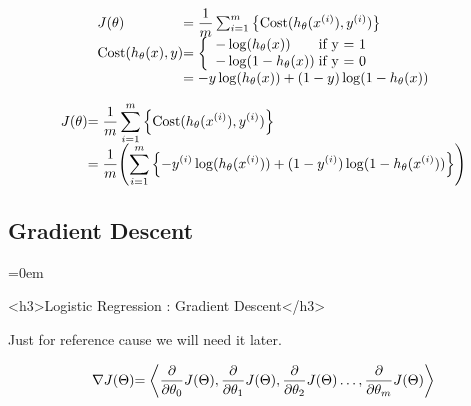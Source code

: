 	\[
	\begin{array}{ l@{} l@{} } 
	J(\theta)
	& =
	\dfrac{1}{m}
	\sum_{i=1}^m
	\left\{
		\mathrm{Cost}(h_\theta(x^{(i)}),y^{(i)})
	\right\} 
	\\ 
	\mathrm{Cost}(h_\theta(x),y)
	& =
	\left\{ 
		\begin{array}{ l@{} l@{} } 
			-\log(h_\theta(x))
			\;
			& \text{if y = 1} 
			\\ 
			-\log(1-h_\theta(x))
			\;
			& \text{if y = 0} 
		\end{array}
	\right.  
	\\ 
	& = 
	-y\log(h_\theta(x))
	+
	(1-y)\log(1-h_\theta(x)) 
	\end{array}
\]


\[
	\begin{array}{ l@{} l@{} } 
	J(\theta)
	& =
	{ \displaystyle 
		\dfrac{1}{m}
		\sum_{i=1}^m
		\left\{
			\mathrm{Cost}(h_\theta(x^{(i)}),y^{(i)})
		\right\}
	}
	\\ 
	& =
	\dfrac{1}{m} 
	{ \displaystyle 
		\left(
			\sum_{i=1}^m
			\left\{
				-y^{(i)}\log(h_\theta(x^{(i)}))
				+
				(1-y^{(i)})\log(1-h_\theta(x^{(i)}))
			\right\}
		\right)
	} 
	\end{array}
\]

\subsectionend
\subsection{Gradient Descent}
\label{ssec:gradient_descent}
\parindent=0em

	<h3>Logistic Regression : Gradient Descent</h3>

Just for reference cause we will need it later.

\[
	\begin{array}{ l@{} l@{} }
		\nabla J(\Theta)
		& =
		\left\langle
		  {\displaystyle \frac{\partial}{\partial \theta_0} J(\Theta)}
		, {\displaystyle \frac{\partial}{\partial \theta_1} J(\Theta)}
		, {\displaystyle \frac{\partial}{\partial \theta_2} J(\Theta)}
		\ldots
		, {\displaystyle \frac{\partial}{\partial \theta_m} J(\Theta)}
		\right\rangle
		\\
	\end{array}
\]


